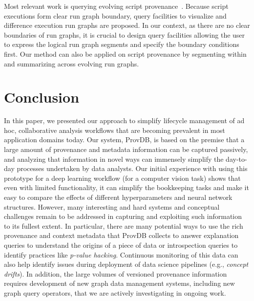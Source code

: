 \documentclass[11pt]{article}
\newcommand{\provdb}{{\sc ProvDB}\xspace}
\begin{document}
Most relevant work is querying evolving script provenance~\cite{ingestions_noworkflow@ipaw14,noworkflow_evolution@ipaw16}. Because script executions form clear run graph
boundary, query facilities to visualize and difference execution run graphs are proposed. In our context, as there are no clear boundaries of run graphs, it is crucial
to design query facilities allowing the user to express the logical run graph segments and specify the boundary conditions first. Our method can also be applied on
script provenance by segmenting within and summarizing across evolving run graphs.


\section{Conclusion}
In this paper, we presented our approach to simplify lifecycle management of ad hoc, collaborative analysis workflows that are becoming prevalent in most application
domains today. Our system, \provdb, is based on the premise that a large amount of provenance and metadata information can be captured passively, and analyzing that
information in novel ways can immensely simplify the day-to-day processes undertaken by data analysts. Our initial experience with using this prototype for a deep
learning workflow (for a computer vision task) shows that even with limited functionality, it can simplify the bookkeeping tasks and make it easy to compare the effects
of different hyperparameters and neural network structures. However, many interesting and hard systems and conceptual challenges remain to be addressed in capturing and
exploiting such information to its fullest extent. In particular, there are many potential ways to use the rich provenance and context metadata that \provdb collects to
answer explanation queries to understand the origins of a piece of data or introspection queries to identify practices like {\em p-value hacking}. Continuous monitoring
of this data can also help identify issues during deployment of data science pipelines (e.g., {\em concept drifts}). In addition, the large volumes of versioned
provenance information requires development of new graph data management systems, including new graph query operators, that we are actively investigating in ongoing
work.
\end{document}
